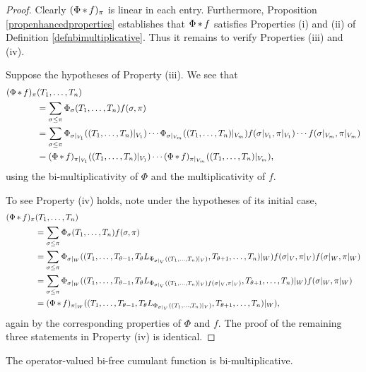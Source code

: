 		\begin{proof}
			Clearly $(\Phi \mathop{\ast} f)_\pi$ is linear in each entry.
			Furthermore, Proposition \ref{propenhancedproperties} establishes that $\Phi \mathop{\ast} f$ satisfies Properties (i) and (ii) of Definition \ref{defnbimultiplicative}.
			Thus it remains to verify Properties (iii) and (iv).

			Suppose the hypotheses of Property (iii).
			We see that
			\begin{align*}
				(\Phi \mathop{\ast} f)_\pi&(T_1,\ldots, T_n) \\
				&= \sum_{\sigma \leq \pi} \Phi_\sigma(T_1, \ldots, T_n) f(\sigma, \pi)
				\\
				&= \sum_{\sigma \leq \pi} \Phi_{\sigma|_{V_1}}((T_1,\ldots, T_n)|_{V_1})
				\cdots \Phi_{\sigma|_{V_m}}((T_1,\ldots, T_n)|_{V_m})
				f(\sigma|_{V_1}, \pi|_{V_1}) \cdots f(\sigma|_{V_m}, \pi|_{V_m})
				\\
				&= (\Phi \mathop{\ast} f)_{\pi|_{V_1}}((T_1,\ldots, T_n)|_{V_1})
				\cdots (\Phi \mathop{\ast} f)_{\pi|_{V_m}}((T_1,\ldots, T_n)|_{V_m}),
			\end{align*}
			using the bi-multiplicativity of $\Phi$ and the multiplicativity of $f$.

			To see Property (iv) holds, note under the hypotheses of its initial case,
			\begin{align*}
				(\Phi \mathop{\ast} f)_\pi&(T_1,\ldots, T_n) \\
				&= \sum_{\sigma \leq \pi} \Phi_\sigma(T_1, \ldots, T_n) f(\sigma, \pi)
				\\
				&= \sum_{\sigma \leq \pi} \Phi_{\sigma|_{W}}((T_1,\ldots, T_{\theta-1}, T_\theta L_{\Phi_{\sigma|_{V}}((T_1, \ldots, T_n)|_V)}, T_{\theta + 1}, \ldots, T_n)|_{W})
				f(\sigma|_{V}, \pi|_{V}) f(\sigma|_{W}, \pi|_{W})
				\\
				&= \sum_{\sigma \leq \pi} \Phi_{\sigma|_{W}}((T_1,\ldots, T_{\theta-1}, T_\theta L_{\Phi_{\sigma|_{V}}((T_1, \ldots, T_n)|_V)f(\sigma|_{V}, \pi|_{V})}, T_{\theta + 1}, \ldots, T_n)|_{W})
				f(\sigma|_{W}, \pi|_{W})
				\\
				&= (\Phi \mathop{\ast} f)_{\pi|_{W}}((T_1,\ldots, T_{\theta-1}, T_\theta L_{\Phi_{\sigma|_{V}}((T_1, \ldots, T_n)|_V)}, T_{\theta + 1}, \ldots, T_n)|_{W}),
			\end{align*}
			again by the corresponding properties of $\Phi$ and $f$.
			The proof of the remaining three statements in Property (iv) is identical.
		\end{proof}

		\begin{corollary}
			\label{cor:cumulantsarebimultiplicative}
			The operator-valued bi-free cumulant function is bi-multiplicative.
		\end{corollary}


















